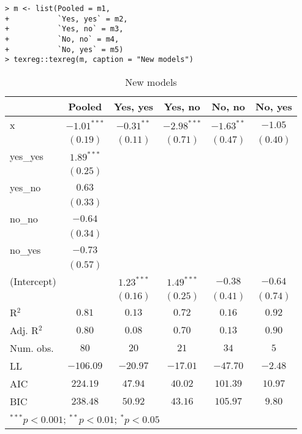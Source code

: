 \documentclass[a4paper]{article}\usepackage[]{graphicx}\usepackage[]{xcolor}
\makeatletter
\newenvironment{kframe}{%
 \def\at@end@of@kframe{}%
 \ifinner\ifhmode%
  \def\at@end@of@kframe{\end{minipage}}%
  \begin{minipage}{\columnwidth}%
 \fi\fi%
 \def\FrameCommand##1{\hskip\@totalleftmargin \hskip-\fboxsep
 \colorbox{shadecolor}{##1}\hskip-\fboxsep
     \hskip-\linewidth \hskip-\@totalleftmargin \hskip\columnwidth}%
 \MakeFramed {\advance\hsize-\width
   \@totalleftmargin\z@ \linewidth\hsize
   \@setminipage}}%
 {\par\unskip\endMakeFramed%
 \at@end@of@kframe}
\makeatother
\begin{document}
\begin{kframe}
\begin{verbatim}
> m <- list(Pooled = m1,
+           `Yes, yes` = m2,
+           `Yes, no` = m3,
+           `No, no` = m4,
+           `No, yes` = m5)
> texreg::texreg(m, caption = "New models")
\end{verbatim}
\end{kframe}
\begin{table}
\begin{center}
\begin{tabular}{l c c c c c}
\hline
 & Pooled & Yes, yes & Yes, no & No, no & No, yes \\
\hline
x           & $-1.01^{***}$ & $-0.31^{**}$ & $-2.98^{***}$ & $-1.63^{**}$ & $-1.05$  \\
            & $(0.19)$      & $(0.11)$     & $(0.71)$      & $(0.47)$     & $(0.40)$ \\
yes\_yes    & $1.89^{***}$  &              &               &              &          \\
            & $(0.25)$      &              &               &              &          \\
yes\_no     & $0.63$        &              &               &              &          \\
            & $(0.33)$      &              &               &              &          \\
no\_no      & $-0.64$       &              &               &              &          \\
            & $(0.34)$      &              &               &              &          \\
no\_yes     & $-0.73$       &              &               &              &          \\
            & $(0.57)$      &              &               &              &          \\
(Intercept) &               & $1.23^{***}$ & $1.49^{***}$  & $-0.38$      & $-0.64$  \\
            &               & $(0.16)$     & $(0.25)$      & $(0.41)$     & $(0.74)$ \\
\hline
R$^2$       & $0.81$        & $0.13$       & $0.72$        & $0.16$       & $0.92$   \\
Adj. R$^2$  & $0.80$        & $0.08$       & $0.70$        & $0.13$       & $0.90$   \\
Num. obs.   & $80$          & $20$         & $21$          & $34$         & $5$      \\
LL          & $-106.09$     & $-20.97$     & $-17.01$      & $-47.70$     & $-2.48$  \\
AIC         & $224.19$      & $47.94$      & $40.02$       & $101.39$     & $10.97$  \\
BIC         & $238.48$      & $50.92$      & $43.16$       & $105.97$     & $9.80$   \\
\hline
\multicolumn{6}{l}{\scriptsize{$^{***}p<0.001$; $^{**}p<0.01$; $^{*}p<0.05$}}
\end{tabular}
\caption{New models}
\label{table:coefficients}
\end{center}
\end{table}
\end{document}
